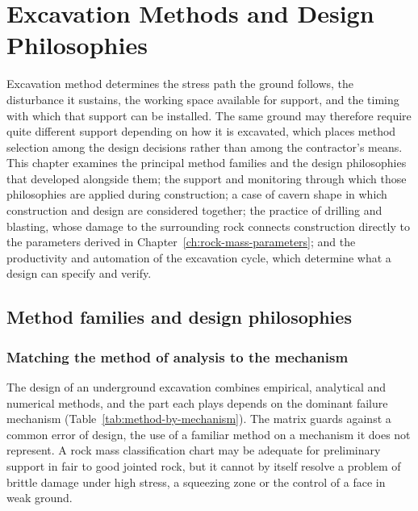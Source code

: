 \chapter{Excavation Methods and Design Philosophies}
\label{ch:construction}

Excavation method determines the stress path the ground follows, the
disturbance it sustains, the working space available for support, and the
timing with which that support can be installed. The same ground may therefore
require quite different support depending on how it is excavated, which places
method selection among the design decisions rather than among the contractor's
means. This chapter examines the principal method families and the design
philosophies that developed alongside them; the support and monitoring through
which those philosophies are applied during construction; a case of cavern
shape in which construction and design are considered together; the practice of
drilling and blasting, whose damage to the surrounding rock connects
construction directly to the parameters derived in
Chapter~\ref{ch:rock-mass-parameters}; and the productivity and automation of
the excavation cycle, which determine what a design can specify and verify.

\section{Method families and design philosophies}
\label{sec:method-families-and-design-philosophies}

\subsection{Matching the method of analysis to the mechanism}
\label{sec:design-guidelines-for-underground-excavation}

The design of an underground excavation combines empirical, analytical and
numerical methods, and the part each plays depends on the dominant failure
mechanism (Table~\ref{tab:method-by-mechanism}). The matrix guards against
a common error of design, the use of a familiar method on a mechanism it does
not represent. A rock mass classification chart may be adequate for
preliminary support in fair to good jointed rock, but it cannot by itself
resolve a problem of brittle damage under high stress, a squeezing zone or the
control of a face in weak ground.

